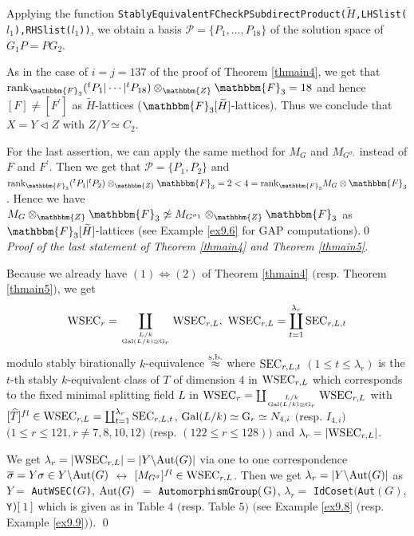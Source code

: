 \documentclass{amsart}
\theoremstyle{plain}
\theoremstyle{definition}
\theoremstyle{remark}
\newcommand{\bZ}{\mathbbm{Z}}\newcommand{\bQ}{\mathbbm{Q}}
\newcommand{\bF}{\mathbbm{F}}\newcommand{\bP}{\mathbbm{P}}
\begin{document}
Applying the function 
{\tt StablyEquivalentFCheckPSubdirectProduct($\widetilde{H}$,LHSlist($l_1$),RHSlist($l_1$))}, 
we obtain a basis 
$\mathcal{P}=\{P_1,\dots,P_{18}\}$ of the solution space of $G_1P=PG_2$. 

As in the case of $i=j=137$ of the proof of {Theorem \ref{thmain4}}, 
we get that 
${\rm rank}_{\bF_3} ({}^tP_1|\cdots|{}^tP_{18})\otimes_\bZ \bF_3=18$ 
and hence 
$[F]\neq [F^\prime]$ as $\widetilde{H}$-lattices 
($\bF_3[\widetilde{H}]$-lattices). 
Thus we conclude that $X=Y\lhd Z$ with $Z/Y\simeq C_2$. 

For the last assertion, 
we can apply the same method for $M_G$ and $M_{G^{\sigma_1}}$ 
instead of $F$ and $F^\prime$. 
Then we get that $\mathcal{P}=\{P_1,P_2\}$ and 
${\rm rank}_{\bF_3} ({}^tP_1|{}^tP_2)\otimes_\bZ \bF_3=2<4={\rm rank}_{\bF_3} M_G\otimes \bF_3$. 
Hence we have 
$M_G\otimes_\bZ \bF_3\not\simeq M_{G^{\sigma_1}}\otimes_\bZ \bF_3$ 
as $\bF_3[\widetilde{H}]$-lattices 
(see Example \ref{ex9.6} for GAP computations).\qed\\

{\it Proof of the last statement of Theorem \ref{thmain4} and Theorem \ref{thmain5}.}

Because we already have $(1)\Leftrightarrow (2)$ of {Theorem \ref{thmain4}} 
$($resp. Theorem \ref{thmain5}$)$, 
we get 
\begin{align*}
{\rm WSEC}_r=\coprod_{L/k\atop {\rm Gal}(L/k)\simeq {\rm G}_r}
{\rm WSEC}_{r,L},\ 
{\rm WSEC}_{r,L}=
\coprod_{t=1}^{\lambda_{r}} {\rm SEC}_{r,L,t}
\end{align*}
modulo stably birationally $k$-equivalence $\stackrel{\rm s.b.}{\approx}$ 
where 
${\rm SEC}_{r,L,t}$ $(1\leq t\leq \lambda_{r})$ is the $t$-th 
stably $k$-equivalent class of $T$ of dimension $4$ in 
${\rm WSEC}_{r,L}$ which corresponds to the fixed minimal splitting field $L$ 
in 
${\rm WSEC}_r=\coprod_{L/k\atop {\rm Gal}(L/k)\simeq {\rm G}_r} {\rm WSEC}_{r,L}$ 
with 
$[\widehat{T}]^{fl}\in {\rm WSEC}_{r,L}
=\coprod_{t=1}^{\lambda_r} {\rm SEC}_{r,L,t}$, 
${\rm Gal}(L/k)\simeq {\rm G}_r\simeq N_{4,i}$ $($resp. $I_{4,i}$$)$
$(1\leq r\leq 121, r\neq 7,8,10,12$$)$ 
$($resp. $(122\leq r\leq 128)$$)$ and 
$\lambda_r=|{\rm WSEC}_{r,L}|$. 

We get $\lambda_r=|{\rm WSEC}_{r,L}|=|Y\backslash {\rm Aut}(G)|$ 
via one to one correspondence 
$\overline{\sigma}=Y \sigma\in Y\backslash {\rm Aut}(G)$ $\leftrightarrow$ 
$[M_{G^\sigma}]^{fl}\in{\rm WSEC}_{r,L}$. 
%
Then we get %
$\lambda_r=|Y\backslash {\rm Aut}(G)|$ 
as $Y=$ {\tt AutWSEC(}$G${\tt )}, 
${\rm Aut}(G)$ $=$ ${\tt AutomorphismGroup(}$G${\tt )}$, 
$\lambda_r=$ {\tt IdCoset}$(${\tt Aut}$(G),${\tt Y}$){\tt [}$\,$1$\,${\tt ]}$
which is given as in Table $4$ $($resp. Table $5$$)$ 
$($see Example \ref{ex9.8} $($resp. Example \ref{ex9.9}$)$$)$. 
\qed
\end{document}
